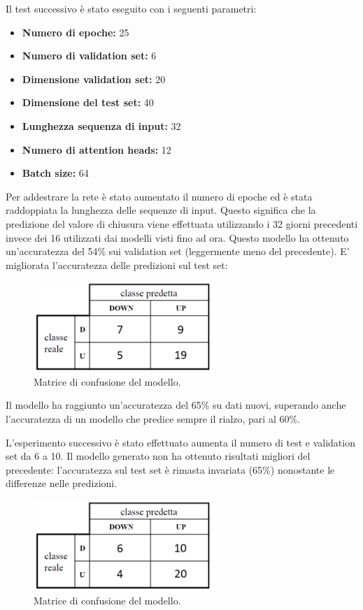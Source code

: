 \documentclass[12pt,a4paper,twoside,openright]{book}
\begin{document}
Il test successivo è stato eseguito con i seguenti parametri:
\begin{itemize}
    \item \textbf{Numero di epoche:} 25
    \item \textbf{Numero di validation set:} 6
    \item \textbf{Dimensione validation set:} 20
    \item \textbf{Dimensione del test set:} 40
    \item \textbf{Lunghezza sequenza di input:} 32
    \item \textbf{Numero di attention heads:} 12
    \item \textbf{Batch size:} 64
\end{itemize}

Per addestrare la rete è stato aumentato il numero di epoche ed è stata raddoppiata la lunghezza delle sequenze di input. Questo significa che la predizione del valore di chiusura viene effettuata utilizzando i 32 giorni precedenti invece dei 16 utilizzati dai modelli visti fino ad ora.
Questo modello ha ottenuto un'accuratezza del 54\% sui validation set (leggermente meno del precedente). E' migliorata l'accuratezza delle predizioni sul test set:

\begin{figure}[H]
\centering
\includegraphics[width=0.6\textwidth]{images/test_2.png}
\caption{Matrice di confusione del modello.}
\label{fig:rapp_file}
\end{figure}

Il modello ha raggiunto un'accuratezza del 65\% su dati nuovi, superando anche l'accuratezza di un modello che predice sempre il rialzo, pari al 60\%.

L'esperimento successivo è stato effettuato aumenta il numero di test e validation set da 6 a 10. Il modello generato non ha ottenuto risultati migliori del precedente: l'accuratezza sul test set è rimasta invariata (65\%) nonostante le differenze nelle predizioni.

\begin{figure}[H]
\centering
\includegraphics[width=0.6\textwidth]{images/test_3.png}
\caption{Matrice di confusione del modello.}
\label{fig:rapp_file}
\end{figure}
\end{document}
